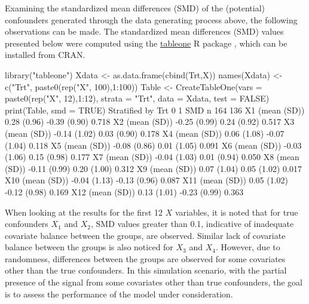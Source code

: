 Examining the standardized mean differences (SMD) of the (potential) confounders generated through the data generating process above, the following observations can be made. The standardized mean differences (SMD) values presented below were computed using the \href{https://cran.r-project.org/package=tableone}{tableone} R package \citep{tableone}, which can be installed from CRAN.
\begin{example}
library("tableone")
Xdata <- as.data.frame(cbind(Trt,X))
names(Xdata) <- c("Trt", paste0(rep("X", 100),1:100))
Table <- CreateTableOne(vars = paste0(rep("X", 12),1:12), strata = "Trt", 
     data = Xdata, test = FALSE)
print(Table, smd = TRUE)
                 Stratified by Trt
                  0            1            SMD   
  n                 164          136              
  X1 (mean (SD))   0.28 (0.96) -0.39 (0.90)  0.718
  X2 (mean (SD))  -0.25 (0.99)  0.24 (0.92)  0.517
  X3 (mean (SD))  -0.14 (1.02)  0.03 (0.90)  0.178
  X4 (mean (SD))   0.06 (1.08) -0.07 (1.04)  0.118
  X5 (mean (SD))  -0.08 (0.86)  0.01 (1.05)  0.091
  X6 (mean (SD))  -0.03 (1.06)  0.15 (0.98)  0.177
  X7 (mean (SD))  -0.04 (1.03)  0.01 (0.94)  0.050
  X8 (mean (SD))  -0.11 (0.99)  0.20 (1.00)  0.312
  X9 (mean (SD))   0.07 (1.04)  0.05 (1.02)  0.017
  X10 (mean (SD)) -0.04 (1.13) -0.13 (0.96)  0.087
  X11 (mean (SD))  0.05 (1.02) -0.12 (0.98)  0.169
  X12 (mean (SD))  0.13 (1.01) -0.23 (0.99)  0.363
\end{example}

When looking at the results for the first 12 $X$ variables, it is noted that for true confounders $X_1$ and $X_2$, SMD values greater than 0.1, indicative of inadequate covariate balance between the groups, are observed. Similar lack of covariate balance between the groups is also noticed for $X_3$ and $X_4$. However, due to randomness, differences between the groups are observed for some covariates other than the true confounders. In this simulation scenario, with the partial presence of the signal from some covariates other than true confounders, the goal is to assess the performance of the model under consideration.


